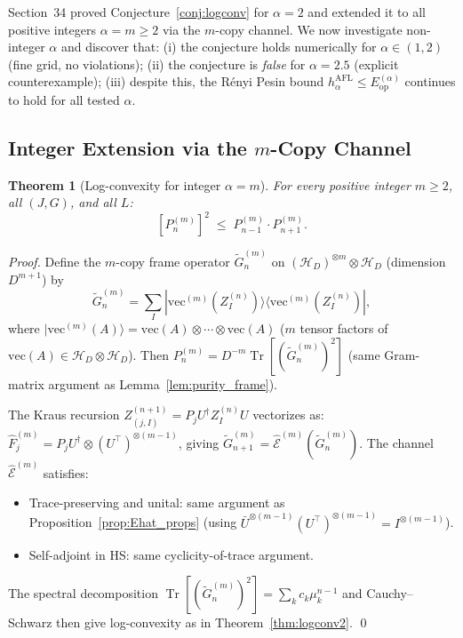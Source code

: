 \documentclass[12pt,a4paper]{article}
\newtheorem{theorem}{Theorem}[section]
\begin{document}
Section~34 proved Conjecture~\ref{conj:logconv} for $\alpha=2$ and extended it to all
positive integers $\alpha=m\geq 2$ via the $m$-copy channel.  We now investigate
non-integer $\alpha$ and discover that:
(i) the conjecture holds numerically for $\alpha\in(1,2)$ (fine grid, no violations);
(ii) the conjecture is \emph{false} for $\alpha=2.5$ (explicit counterexample);
(iii) despite this, the Rényi Pesin bound $h_\alpha^{\mathrm{AFL}}\leq E_{\mathrm{op}}^{(\alpha)}$
continues to hold for all tested $\alpha$.

\subsection{Integer Extension via the $m$-Copy Channel}
\label{sec:mcopy}

\begin{theorem}[Log-convexity for integer $\alpha=m$]
\label{thm:logconv_int}
For every positive integer $m\geq 2$, all $(J,G)$, and all $L$:
\[
  \left[P_n^{(m)}\right]^2 \;\leq\; P_{n-1}^{(m)}\cdot P_{n+1}^{(m)}.
\]
\end{theorem}

\begin{proof}
Define the $m$-copy frame operator $\widetilde{G}_n^{(m)}$ on
$(\mathcal{H}_D)^{\otimes m}\otimes\mathcal{H}_D$ (dimension $D^{m+1}$) by
\[
  \widetilde{G}_n^{(m)} = \sum_I |\mathrm{vec}^{(m)}(Z_I^{(n)})\rangle\langle\mathrm{vec}^{(m)}(Z_I^{(n)})|,
\]
where $|\mathrm{vec}^{(m)}(A)\rangle = \mathrm{vec}(A)\otimes\cdots\otimes\mathrm{vec}(A)$
($m$ tensor factors of $\mathrm{vec}(A)\in\mathcal{H}_D\otimes\mathcal{H}_D$).
Then $P_n^{(m)}=D^{-m}\operatorname{Tr}[(\widetilde{G}_n^{(m)})^2]$ (same Gram-matrix
argument as Lemma~\ref{lem:purity_frame}).

The Kraus recursion $Z_{(j,I)}^{(n+1)}=P_j U^\dagger Z_I^{(n)}U$ vectorizes as:
$\hat{F}_j^{(m)}=P_j U^\dagger\otimes(U^\top)^{\otimes(m-1)}$,
giving $\widetilde{G}_{n+1}^{(m)}=\hat{\mathcal{E}}^{(m)}(\widetilde{G}_n^{(m)})$.
The channel $\hat{\mathcal{E}}^{(m)}$ satisfies:
\begin{itemize}
\item Trace-preserving and unital: same argument as Proposition~\ref{prop:Ehat_props}
  (using $\bar{U}^{\otimes(m-1)}(U^\top)^{\otimes(m-1)}=I^{\otimes(m-1)}$).
\item Self-adjoint in HS: same cyclicity-of-trace argument.
\end{itemize}
The spectral decomposition $\operatorname{Tr}[(\widetilde{G}_n^{(m)})^2]=\sum_k c_k\mu_k^{n-1}$
and Cauchy--Schwarz then give log-convexity as in Theorem~\ref{thm:logconv2}. \qed
\end{proof}
\end{document}
